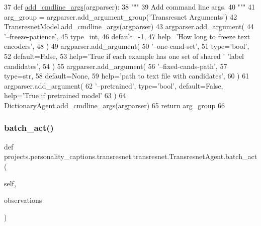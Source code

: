 \begin{DoxyCode}
37     \textcolor{keyword}{def }\hyperlink{namespaceparlai_1_1agents_1_1drqa_1_1config_a62fdd5554f1da6be0cba185271058320}{add\_cmdline\_args}(argparser):
38         \textcolor{stringliteral}{"""}
39 \textcolor{stringliteral}{        Add command line args.}
40 \textcolor{stringliteral}{        """}
41         arg\_group = argparser.add\_argument\_group(\textcolor{stringliteral}{'Transresnet Arguments'})
42         TransresnetModel.add\_cmdline\_args(argparser)
43         argparser.add\_argument(
44             \textcolor{stringliteral}{'--freeze-patience'},
45             type=int,
46             default=-1,
47             help=\textcolor{stringliteral}{'How long to freeze text encoders'},
48         )
49         argparser.add\_argument(
50             \textcolor{stringliteral}{'--one-cand-set'},
51             type=\textcolor{stringliteral}{'bool'},
52             default=\textcolor{keyword}{False},
53             help=\textcolor{stringliteral}{'True if each example has one set of shared '} \textcolor{stringliteral}{'label candidates'},
54         )
55         argparser.add\_argument(
56             \textcolor{stringliteral}{'--fixed-cands-path'},
57             type=str,
58             default=\textcolor{keywordtype}{None},
59             help=\textcolor{stringliteral}{'path to text file with candidates'},
60         )
61         argparser.add\_argument(
62             \textcolor{stringliteral}{'--pretrained'}, type=\textcolor{stringliteral}{'bool'}, default=\textcolor{keyword}{False}, help=\textcolor{stringliteral}{'True if pretrained model'}
63         )
64         DictionaryAgent.add\_cmdline\_args(argparser)
65         \textcolor{keywordflow}{return} arg\_group
66 
\end{DoxyCode}
\mbox{\label{classprojects_1_1personality__captions_1_1transresnet_1_1transresnet_1_1TransresnetAgent_ac87e6396d4b4e3d6d8c69202940a2b11}} 
\subsubsection{\texorpdfstring{batch\+\_\+act()}{batch\_act()}}
{\footnotesize\ttfamily def projects.\+personality\+\_\+captions.\+transresnet.\+transresnet.\+Transresnet\+Agent.\+batch\+\_\+act (\begin{DoxyParamCaption}\item[{}]{self,  }\item[{}]{observations }\end{DoxyParamCaption})}


